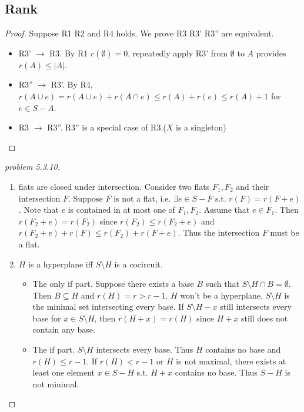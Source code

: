 \subsection{Rank}
\begin{proof}
    Suppose R1 R2 and R4 holds. We prove R3 R3' R3'' are equivalent.
    \begin{itemize}
        \item R3' $\to$ R3. By R1 $r(\emptyset)=0$, repeatedly apply R3' from $\emptyset$ to $A$ provides $r(A)\leq |A|$.
        \item R3'' $\to$ R3'. By R4, $r(A\cup e)=r(A\cup e)+r(A\cap e)\leq r(A)+r(e)\leq r(A)+1$ for $e\in S-A$.
        \item R3 $\to$ R3''. R3'' is a special case of R3.($X$ is a singleton)
    \end{itemize}
\end{proof}
\begin{proof}[problem 5.3.10]
    \begin{enumerate}
        \item flats are closed under intersection. Consider two flats $F_1,F_2$ and their intersection $F$. Suppose $F$ is not a flat, i.e. $\exists e\in S-F$ s.t. $r(F)=r(F+e)$. Note that $e$ is contained in at most one of $F_1,F_2$. Assume that $e\in F_1$. Then $r(F_2+e)=r(F_2)$ since $r(F_2)\leq r(F_2+e)$ and $r(F_2+e)+r(F)\leq r(F_2)+r(F+e)$. Thus the intersection $F$ must be a flat.
        \item $H$ is a hyperplane iff $S\setminus H$ is a cocircuit.
        \begin{itemize}
            \item The only if part. Suppose there exists a base $B$ such that $S\setminus H\cap B=\emptyset$. Then $B\subseteq H$ and $r(H)=r>r-1$. $H$ won't be a hyperplane. $S\setminus H$ is the minimal set intersecting every base. If $S\setminus H -x$ still intersects every base for $x\in S\setminus H$, then $r(H+x)=r(H)$ since $H+x$ still does not contain any base.
            \item The if part. $S\setminus H$ intersects every base. Thus $H$ contains no base and $r(H)\leq r-1$. If $r(H)<r-1$ or $H$ is not maximal, there exists at least one element $x\in S-H$ s.t. $H+x$ contains no base. Thus $S-H$ is not minimal.
        \end{itemize}
    \end{enumerate}
\end{proof}
